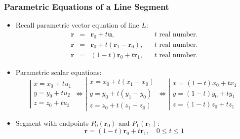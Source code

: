 \begin{frame}
\frametitle{Parametric Equations of a Line Segment}
\begin{itemize}
\item Recall parametric vector equation of line $L$:
\[\begin{array}{rclll}
\textbf{r} &=& \textbf{r}_0 +  t\textbf{u},  && t \text{ real number.}\\
\textbf{r} &=& \textbf{r}_0 + t(\textbf{r}_1-\textbf{r}_0), && t \text{ real number.}\\
\textbf{r} &=& (1-t)\textbf{r}_0 + t\textbf{r}_1, && t \text{ real number.}
\end{array}
\]
\item<2-> Parametric scalar equations:
%
$$\left| \begin{array}{l}
x  = x_0 + tu_1 \\
y  = y_0 + tu_2 \\
z  = z_0 + tu_3
\end{array}
\right. \Leftrightarrow \left| \begin{array}{l}
x  = x_0 + t(x_1-x_0) \\
y  = y_0 + t(y_1-y_0) \\
z  = z_0 + t(z_1-z_0)
\end{array}
\right. \Leftrightarrow \left| \begin{array}{l}
x  = (1-t)x_0 + tx_1 \\
y  = (1-t)y_0 + ty_1 \\
z  = (1-t)z_0 + tz_1
\end{array}
\right. $$
\item<3-> Segment with endpoints $P_0(\textbf{r}_0)$ and $P_1(\textbf{r}_1)$:
%
$$\textbf{r} = (1-t)\textbf{r}_0 + t\textbf{r}_1, \quad 0 \leqslant t \leqslant 1$$
\end{itemize}

\end{frame}